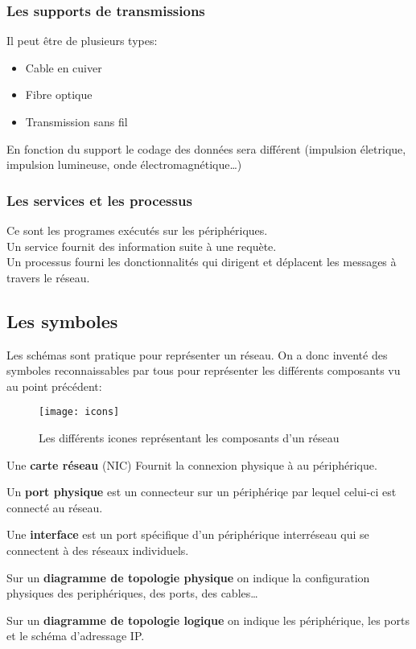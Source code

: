 \documentclass[10pt,a4paper]{article}
\begin{document}
 \subsubsection{Les supports de transmissions}
 Il peut être de plusieurs types:
 \begin{itemize}
	 \item Cable en cuiver
	 \item Fibre optique
	 \item Transmission sans fil
 \end{itemize}
 En fonction du support le codage des données sera différent (impulsion életrique, impulsion lumineuse, onde électromagnétique\ldots)

 \subsubsection{Les services et les processus}
 Ce sont les programes exécutés sur les périphériques.\\
 \indent
 Un service fournit des information suite à une requète.\\
 \indent
 Un processus fourni les donctionnalités qui dirigent et déplacent les messages à travers le réseau.

 \subsection{Les symboles}
 Les schémas sont pratique pour représenter un réseau. On a donc inventé des symboles reconnaissables par tous pour représenter les différents composants vu au point précédent:
 \begin{figure}[h]
	 \centering
	 \texttt{[image: icons]}
	 \caption{Les différents icones représentant les composants d'un réseau}
 \end{figure}

 \smallskip
 \indent
 Une \textbf{carte réseau} (NIC) Fournit la connexion physique à au périphérique.

 \smallskip
 \indent
 Un \textbf{port physique} est un connecteur sur un périphériqe par lequel celui-ci est connecté au réseau.

 \smallskip
 \indent
 Une \textbf{interface} est un port spécifique d'un périphérique interréseau qui se connectent à des réseaux individuels.

 \medskip
 \indent
 Sur un \textbf{diagramme de topologie physique} on indique la configuration physiques des periphériques, des ports, des cables\ldots

 \smallskip
 \indent
 Sur un \textbf{diagramme de topologie logique} on indique les périphérique, les ports et le schéma d'adressage IP\@.







 
\end{document}
